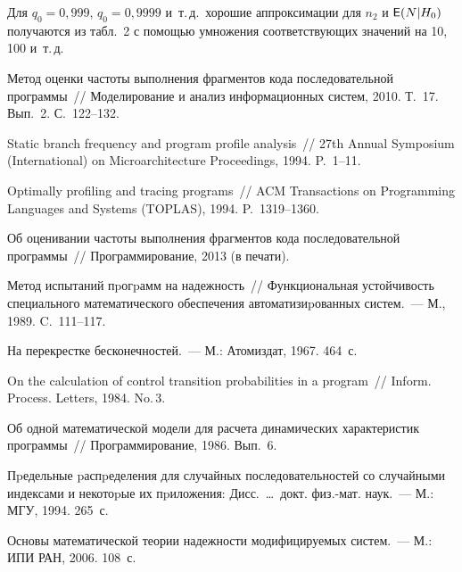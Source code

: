 \begin{multicols}{2}
Для $q_0=0{,}999$, $q_0=0{,}9999$ и~т.\,д.\ хорошие аппроксимации для
$n_2$ и ${\sf E}(N|H_0)$ получаются из табл.~2 с помощью умножения
соответствующих значений на 10, 100 и~т.\,д.



{\small\frenchspacing
{%
\begin{thebibliography}{99}
 Метод оценки частоты выполнения фрагментов
кода последовательной программы~// Моделирование и анализ
информационных систем, 2010. Т.~17. Вып.~2. С.~122--132.

 Static branch
frequency and program profile analysis~// 27th
Annual  Symposium (International) on Microarchitecture Proceedings, 1994. P.~1--11.

 Optimally profiling
and tracing programs~// ACM Transactions on Programming Languages and
Systems (TOPLAS), 1994. P.~1319--1360.

Об оценивании час\-то\-ты выполнения фрагментов
кода последовательной программы~// Программирование, 2013 (в печати).

 Метод испытаний пpогpамм на
надежность~// Функциональная устойчивость специального
математического обеспечения автоматизиpованных сис\-тем.~--- М., 1989.
C.~111--117.

 На перекрестке бесконечностей.~--- М.: Атомиздат, 1967. 464~с.

 On the calculation of control 
transition probabilities in a program~// Inform. Process. Letters, 1984. No.\,3.

Об одной математической модели для расчета
динамических характеристик программы~// Программирование, 1986. Вып.~6.

 Пpедельные pаспpеделения для
случайных последовательностей со случайными индексами и некотоpые их
пpиложения: Дисс.\ \ldots\ докт. физ.-мат. наук.~--- М.: МГУ, 1994. 265~с.

 Основы
математической теории надежности модифицируемых систем.~--- М.: ИПИ РАН, 2006. 108~с.


\end{thebibliography}}}
\end{multicols}
